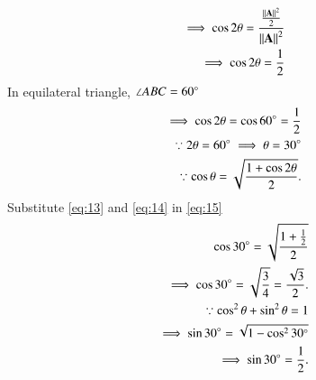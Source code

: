 \documentclass[journal,12pt,twocolumn]{IEEEtran}
\begin{document}
\begin{align}
    \implies\cos2\theta=\frac{\frac{\left\lVert\mathbf{A}\right\rVert^2}{2}}{\left\lVert\mathbf{A}\right\rVert^2}\\
    \implies\cos2\theta=\frac{1}{2}
\end{align}
In equilateral triangle, $\angle ABC=60\degree$
\begin{align}
    \label{eq:13}\implies\cos2\theta = \cos60\degree=\frac{1}{2}\\
    \label{eq:14}\because 2\theta = 60\degree \implies \theta = 30\degree\\
    \label{eq:15}\because \cos\theta = \sqrt{\frac{1+\cos2\theta}{2}}.
\end{align}
Substitute \ref{eq:13} and \ref{eq:14} in \ref{eq:15}
\begin{align}
    \cos30\degree = \sqrt{\frac{1+\frac{1}{2}}{2}}\\
    \implies \cos30\degree= \sqrt{\frac{3}{4}} = \frac{\sqrt{3}}{2}.\\
    \because \cos^2\theta +\sin^2\theta = 1\\
    \implies \sin30\degree = \sqrt{1-\cos^230\degree}\\
    \implies\sin30\degree = \frac{1}{2}.
\end{align} 
\end{document}
